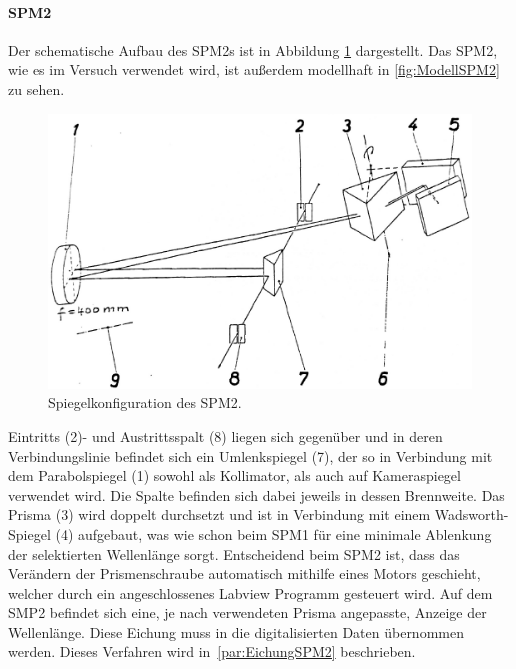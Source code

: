 \documentclass[a4paper,twoside,final]{article}
\begin{document}
\newpage
\paragraph{SPM2}
Der schematische Aufbau des SPM2s ist in Abbildung \ref{fig:SPM2} dargestellt. Das SPM2, wie es im Versuch verwendet wird, ist außerdem modellhaft in \ref{fig:ModellSPM2} zu sehen.

\begin{figure}
    \centering
        \includegraphics[width=\textwidth/2]{Bilder/SPM2.pdf}
    \caption{Spiegelkonfiguration des SPM2.}
    \label{fig:SPM2}
\end{figure}

Eintritts (2)- und Austrittsspalt (8) liegen sich gegenüber und in deren Verbindungslinie befindet sich ein Umlenkspiegel (7), der so in Verbindung mit dem Parabolspiegel (1) sowohl als Kollimator, als auch auf Kameraspiegel verwendet wird. Die Spalte befinden sich dabei jeweils in dessen Brennweite. Das Prisma (3) wird doppelt durchsetzt und ist in Verbindung mit einem Wadsworth-Spiegel (4) aufgebaut, was wie schon beim SPM1 für eine minimale Ablenkung der selektierten Wellenlänge sorgt. Entscheidend beim SPM2 ist, dass das Verändern der Prismenschraube automatisch mithilfe eines Motors geschieht, welcher durch ein angeschlossenes Labview Programm gesteuert wird. Auf dem SMP2 befindet sich eine, je nach verwendeten Prisma angepasste, Anzeige der Wellenlänge. Diese Eichung muss in die digitalisierten Daten übernommen werden. Dieses Verfahren wird in~\ref{par:EichungSPM2} beschrieben.


\end{document}
